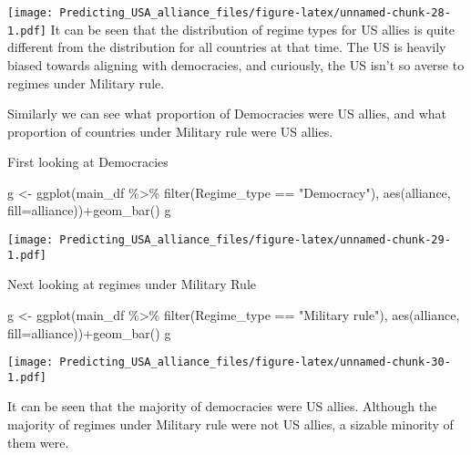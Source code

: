 \documentclass[
]{article}
\newenvironment{Shaded}{\begin{snugshade}}{\end{snugshade}}
\newcommand{\AttributeTok}[1]{\textcolor[rgb]{0.77,0.63,0.00}{#1}}
\newcommand{\FunctionTok}[1]{\textcolor[rgb]{0.00,0.00,0.00}{#1}}
\newcommand{\NormalTok}[1]{#1}
\newcommand{\OtherTok}[1]{\textcolor[rgb]{0.56,0.35,0.01}{#1}}
\newcommand{\SpecialCharTok}[1]{\textcolor[rgb]{0.00,0.00,0.00}{#1}}
\newcommand{\StringTok}[1]{\textcolor[rgb]{0.31,0.60,0.02}{#1}}
\begin{document}
\texttt{[image: Predicting\_USA\_alliance\_files/figure-latex/unnamed-chunk-28-1.pdf]}
It can be seen that the distribution of regime types for US allies is
quite different from the distribution for all countries at that time.
The US is heavily biased towards aligning with democracies, and
curiously, the US isn't so averse to regimes under Military rule.

Similarly we can see what proportion of Democracies were US allies, and
what proportion of countries under Military rule were US allies.

First looking at Democracies

\begin{Shaded}
\begin{Highlighting}[]
\NormalTok{g }\OtherTok{\textless{}{-}} \FunctionTok{ggplot}\NormalTok{(main\_df }\SpecialCharTok{\%\textgreater{}\%} \FunctionTok{filter}\NormalTok{(Regime\_type }\SpecialCharTok{==} \StringTok{"Democracy"}\NormalTok{), }\FunctionTok{aes}\NormalTok{(alliance, }\AttributeTok{fill=}\NormalTok{alliance))}\SpecialCharTok{+}\FunctionTok{geom\_bar}\NormalTok{() }
\NormalTok{g}
\end{Highlighting}
\end{Shaded}

\texttt{[image: Predicting\_USA\_alliance\_files/figure-latex/unnamed-chunk-29-1.pdf]}

Next looking at regimes under Military Rule

\begin{Shaded}
\begin{Highlighting}[]
\NormalTok{g }\OtherTok{\textless{}{-}} \FunctionTok{ggplot}\NormalTok{(main\_df }\SpecialCharTok{\%\textgreater{}\%} \FunctionTok{filter}\NormalTok{(Regime\_type }\SpecialCharTok{==} \StringTok{"Military rule"}\NormalTok{), }\FunctionTok{aes}\NormalTok{(alliance, }\AttributeTok{fill=}\NormalTok{alliance))}\SpecialCharTok{+}\FunctionTok{geom\_bar}\NormalTok{() }
\NormalTok{g}
\end{Highlighting}
\end{Shaded}

\texttt{[image: Predicting\_USA\_alliance\_files/figure-latex/unnamed-chunk-30-1.pdf]}

It can be seen that the majority of democracies were US allies. Although
the majority of regimes under Military rule were not US allies, a
sizable minority of them were.
\end{document}
